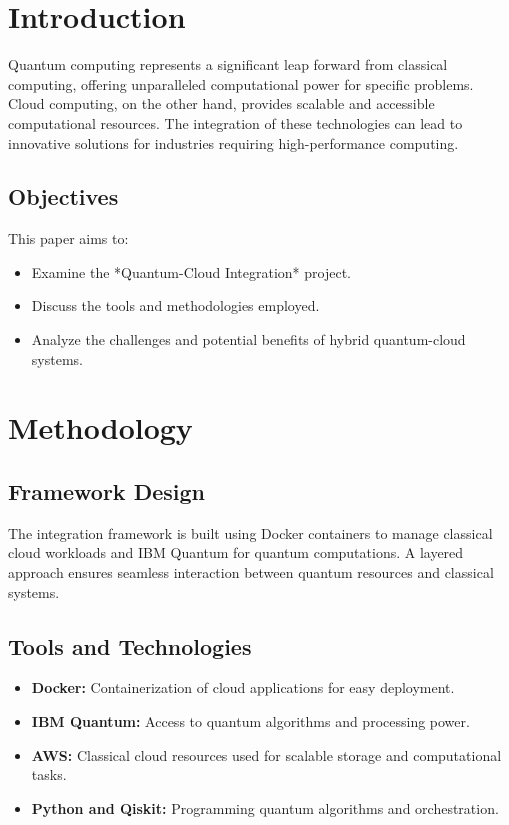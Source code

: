 \documentclass[12pt,a4paper]{article}
\begin{document}
\newpage

\section{Introduction}
Quantum computing represents a significant leap forward from classical computing, offering unparalleled computational power for specific problems. Cloud computing, on the other hand, provides scalable and accessible computational resources. The integration of these technologies can lead to innovative solutions for industries requiring high-performance computing.

\subsection{Objectives}
This paper aims to:
\begin{itemize}
    \item Examine the *Quantum-Cloud Integration* project.
    \item Discuss the tools and methodologies employed.
    \item Analyze the challenges and potential benefits of hybrid quantum-cloud systems.
\end{itemize}

\section{Methodology}
\subsection{Framework Design}
The integration framework is built using Docker containers to manage classical cloud workloads and IBM Quantum for quantum computations. A layered approach ensures seamless interaction between quantum resources and classical systems.

\subsection{Tools and Technologies}
\begin{itemize}
    \item \textbf{Docker:} Containerization of cloud applications for easy deployment.
    \item \textbf{IBM Quantum:} Access to quantum algorithms and processing power.
    \item \textbf{AWS:} Classical cloud resources used for scalable storage and computational tasks.
    \item \textbf{Python and Qiskit:} Programming quantum algorithms and orchestration.
\end{itemize}
\end{document}

